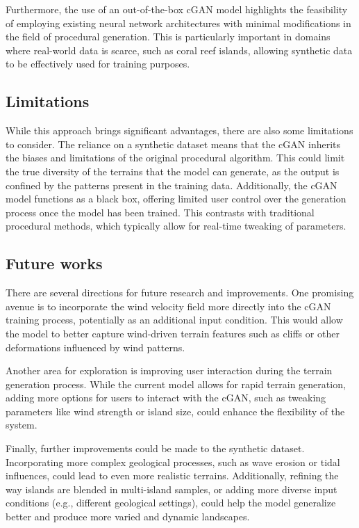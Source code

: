 Furthermore, the use of an out-of-the-box cGAN model highlights the feasibility of employing existing neural network architectures with minimal modifications in the field of procedural generation. This is particularly important in domains where real-world data is scarce, such as coral reef islands, allowing synthetic data to be effectively used for training purposes.

\subsection{Limitations}

While this approach brings significant advantages, there are also some limitations to consider. The reliance on a synthetic dataset means that the cGAN inherits the biases and limitations of the original procedural algorithm. This could limit the true diversity of the terrains that the model can generate, as the output is confined by the patterns present in the training data. Additionally, the cGAN model functions as a black box, offering limited user control over the generation process once the model has been trained. This contrasts with traditional procedural methods, which typically allow for real-time tweaking of parameters.

\subsection{Future works}

There are several directions for future research and improvements. One promising avenue is to incorporate the wind velocity field more directly into the cGAN training process, potentially as an additional input condition. This would allow the model to better capture wind-driven terrain features such as cliffs or other deformations influenced by wind patterns.

Another area for exploration is improving user interaction during the terrain generation process. While the current model allows for rapid terrain generation, adding more options for users to interact with the cGAN, such as tweaking parameters like wind strength or island size, could enhance the flexibility of the system.

Finally, further improvements could be made to the synthetic dataset. Incorporating more complex geological processes, such as wave erosion or tidal influences, could lead to even more realistic terrains. Additionally, refining the way islands are blended in multi-island samples, or adding more diverse input conditions (e.g., different geological settings), could help the model generalize better and produce more varied and dynamic landscapes.



